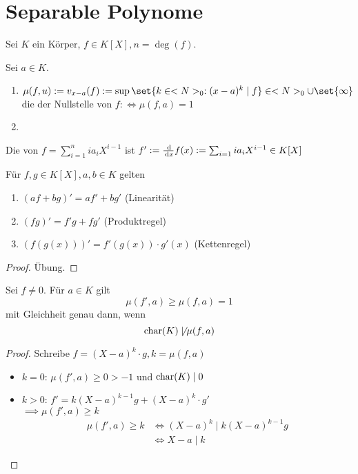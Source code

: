 \section{Separable Polynome}
Sei $K$ ein Körper, $f \in K[X], n = \deg(f)$.
\begin{definition}[title]
	Sei $a \in K$.
	\begin{enumerate}
		\item $\mu(f,u) := v_{x-a}(f) := \sup \set{k \in \N_0 : (x-a)^k \mid f} \in \N_0 \cup \set{\infty}$ die  der Nullstelle von $f :\iff \mu(f,a) = 1$
		\item 
	\end{enumerate}
\end{definition}
\begin{remark}
	
\end{remark}
\begin{definition}[title]
	Die  von $f = \sum_{i=1}^n i a_i X^{i-1}$ ist $f' := \frac{\,\mathrm{d}}{\,\mathrm{d} x} f(x) := \sum_{i=1} i a_i X^{i-1} \in K[X]$
\end{definition}
\begin{lemma}
	Für $f,g \in K[X], a,b \in K$ gelten\begin{enumerate}
		\item $(af + bg)' = a f' + b g'$ (Linearität)
		\item $(fg)' = f'g + fg'$ (Produktregel)
		\item $(f(g(x)))' = f'(g(x))\cdot g'(x)$ (Kettenregel)
	\end{enumerate}
\end{lemma}
\begin{proof}
	Übung.
\end{proof}
\begin{lemma}
	Sei $f \neq 0$. Für $a \in K$ gilt
	\[
	\mu(f' , a) \ge \mu(f,a) = 1
	\]
	mit Gleichheit genau dann, wenn
	\[
	\operatorname{char}(K) \not\mid \mu(f,a)
	\]
\end{lemma}
\begin{proof}
	Schreibe $f = (X-a)^k \cdot g, k = \mu(f,a)$
	\begin{itemize}
		\item $k=0$: $\mu(f', a) \ge 0 > -1$ und $\operatorname{char}(K) \mid 0$
		\item $k>0$: $f' = k(X-a)^{k-1}g + (X-a)^k \cdot g'$\\
		$\implies \mu(f',a) \ge k$\\
		\begin{align*}
			\mu(f',a) \ge k &\iff (X-a)^k \mid k(X-a)^{k-1}g\\
			&\iff X-a \mid k
		\end{align*}
	\end{itemize}
\end{proof}
